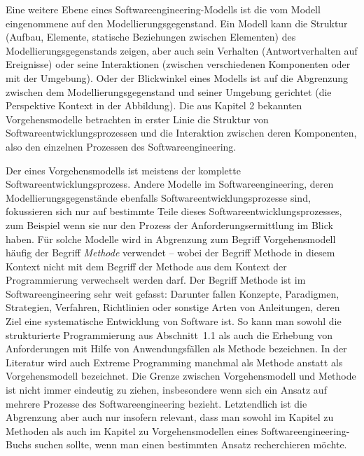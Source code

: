 Eine weitere Ebene eines Softwareengineering-Modells ist die vom Modell eingenommene
auf den Modellierungsgegenstand. Ein Modell kann die Struktur (\zb Aufbau, Elemente, statische Beziehungen zwischen Elementen) des Model\-lie\-rungs\-gegen\-stands zeigen, aber auch sein Verhalten (\zb Antwortverhalten auf \mbox{Ereignisse}) oder seine Interaktionen (zwischen verschiedenen Komponenten oder mit der Umgebung). Oder der Blickwinkel eines Modells ist auf die Abgrenzung zwischen dem Modellierungsgegenstand und seiner Umgebung gerichtet (die Perspektive Kontext in der Abbildung). Die aus Kapitel 2 %
bekannten Vorgehensmodelle betrachten in erster Linie die Struktur von Softwareentwicklungsprozessen und die Interaktion zwischen deren Komponenten, also den einzelnen Prozessen des Softwareengineering. 

\vspace{1mm} %

Der 
eines Vorgehensmodells ist meistens der komplette Softwareentwicklungsprozess. Andere Modelle im Softwareengineering, deren Modellierungsgegenstände ebenfalls Softwareentwicklungsprozesse sind, fokussieren sich nur auf bestimmte Teile dieses Softwareentwicklungsprozesses, zum Beispiel wenn sie nur den Prozess der Anforderungsermittlung im Blick haben. Für solche Modelle wird in Abgrenzung zum Begriff Vorgehensmodell häufig der Begriff \textit{Methode} verwendet – wobei der Begriff Methode in diesem Kontext nicht mit dem Begriff der Methode aus dem Kontext der Programmierung verwechselt werden darf. Der Begriff Methode ist im Softwareengineering sehr weit gefasst: Darunter fallen Konzepte, Para\-digmen, Strategien, Verfahren, Richtlinien oder sonstige Arten von Anleitungen, deren Ziel eine systematische Entwicklung von Software ist. So kann man sowohl die strukturierte Programmierung aus Abschnitt~1.1 %
als auch die Erhebung von Anforderungen mit Hilfe von Anwendungsfällen als Methode bezeichnen. In der Literatur wird auch Extreme Programming manchmal als Methode anstatt als Vorgehensmodell bezeichnet. Die Grenze zwischen Vorgehensmodell und Methode ist nicht immer eindeutig zu ziehen, insbesondere wenn sich ein Ansatz auf mehrere Prozesse des Softwareengineering bezieht. Letztendlich ist die Abgrenzung aber auch nur insofern relevant, dass man sowohl im Kapitel zu Methoden als auch im Kapitel zu Vorgehensmodellen eines Softwareengineering-Buchs suchen sollte, wenn man einen bestimmten Ansatz recherchieren möchte.

